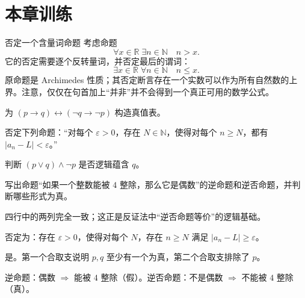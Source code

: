 \section{本章训练}

\begin{workedexample}{否定一个含量词命题}
考虑命题
\[
    \forall x\in\mathbb{R}\;\exists n\in\mathbb{N}\quad n>x.
\]
它的否定需要逐个反转量词，并否定最后的谓词：
\[
    \exists x\in\mathbb{R}\;\forall n\in\mathbb{N}\quad n\le x.
\]
原命题是 Archimedes 性质；其否定断言存在一个实数可以作为所有自然数的上界。注意，仅仅在句首加上“并非”并不会得到一个真正可用的数学公式。
\end{workedexample}

\begin{chapterexercises}
    \item 为 $(p\to q)\leftrightarrow(\neg q\to\neg p)$ 构造真值表。
    \item 否定下列命题：“对每个 $\varepsilon>0$，存在 $N\in\mathbb{N}$，使得对每个 $n\ge N$，都有 $|a_n-L|<\varepsilon$。”
    \item 判断 $(p\lor q)\land\neg p$ 是否逻辑蕴含 $q$。
    \item 写出命题“如果一个整数能被 $4$ 整除，那么它是偶数”的逆命题和逆否命题，并判断哪些形式为真。
\end{chapterexercises}

\begin{selectedhints}
    \item 四行中的两列完全一致；这正是反证法中“逆否命题等价”的逻辑基础。
    \item 否定为：存在 $\varepsilon>0$，使得对每个 $N$，存在 $n\ge N$ 满足 $|a_n-L|\ge\varepsilon$。
    \item 是。第一个合取支说明 $p,q$ 至少有一个为真，第二个合取支排除了 $p$。
    \item 逆命题：偶数 $\Rightarrow$ 能被 $4$ 整除（假）。逆否命题：不是偶数 $\Rightarrow$ 不能被 $4$ 整除（真）。
\end{selectedhints}
